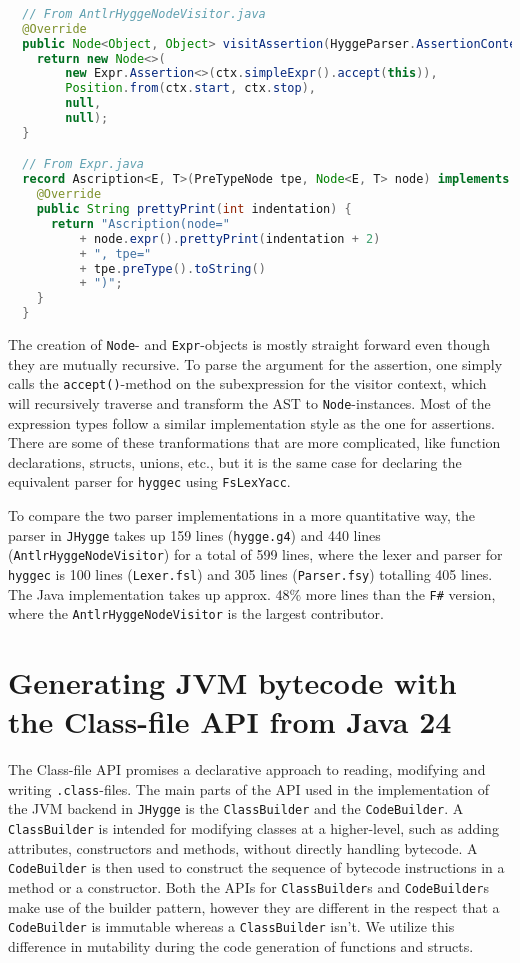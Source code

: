 \begin{lstlisting}[language=Java]
 
  // From AntlrHyggeNodeVisitor.java
  @Override
  public Node<Object, Object> visitAssertion(HyggeParser.AssertionContext ctx) {
    return new Node<>(
        new Expr.Assertion<>(ctx.simpleExpr().accept(this)),
        Position.from(ctx.start, ctx.stop),
        null,
        null);
  }

  // From Expr.java
  record Ascription<E, T>(PreTypeNode tpe, Node<E, T> node) implements Expr<E, T> {
    @Override
    public String prettyPrint(int indentation) {
      return "Ascription(node="
          + node.expr().prettyPrint(indentation + 2)
          + ", tpe="
          + tpe.preType().toString()
          + ")";
    }
  }

\end{lstlisting}

The creation of \texttt{Node}- and \texttt{Expr}-objects is mostly straight forward even though they are mutually recursive.
To parse the argument for the assertion, one simply calls the \texttt{accept()}-method on the subexpression for the visitor
context, which will recursively traverse and transform the AST to \texttt{Node}-instances. Most of the expression types
follow a similar implementation style as the one for assertions. There are some of these tranformations that are more complicated,
like function declarations, structs, unions, etc., but it is the same case for declaring the equivalent parser for \texttt{hyggec}
using \texttt{FsLexYacc}.

To compare the two parser implementations in a more quantitative way, the parser in \texttt{JHygge}
takes up 159 lines (\texttt{hygge.g4}) and 440 lines (\texttt{AntlrHyggeNodeVisitor}) for a total of 599 lines, where the lexer and
parser for \texttt{hyggec} is 100 lines (\texttt{Lexer.fsl}) and 305 lines (\texttt{Parser.fsy}) totalling 405 lines. The Java
implementation takes up approx. $48\%$ more lines than the \texttt{F\#} version, where the \texttt{AntlrHyggeNodeVisitor} is
the largest contributor.

\section{Generating JVM bytecode with the Class-file API from Java 24}

The Class-file API promises a declarative approach to reading, modifying and writing \texttt{.class}-files. The main parts of the
API used in the implementation of the JVM backend in \texttt{JHygge} is the \texttt{ClassBuilder} and the \texttt{CodeBuilder}.
A \texttt{ClassBuilder} is intended for modifying classes at a higher-level, such as adding attributes, constructors and methods,
without directly handling bytecode. A \texttt{CodeBuilder} is then used to construct the sequence of bytecode instructions in
a method or a constructor. Both the APIs for \texttt{ClassBuilder}s and \texttt{CodeBuilder}s make use of the builder pattern,
however they are different in the respect that a \texttt{CodeBuilder} is immutable whereas a \texttt{ClassBuilder} isn't.
We utilize this difference in mutability during the code generation of functions and structs.

